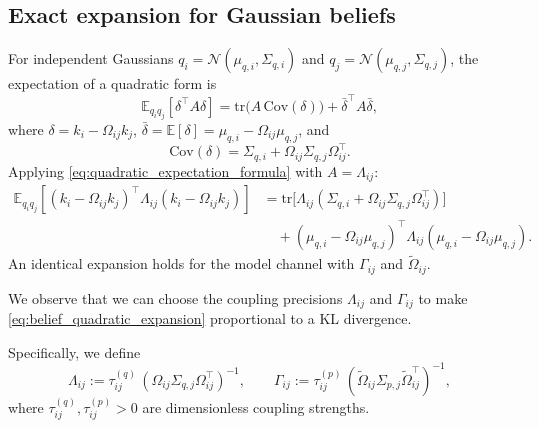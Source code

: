 \documentclass[11pt]{article}
\begin{document}
\subsection{Exact expansion for Gaussian beliefs}
For independent Gaussians $q_i = \mathcal{N}(\mu_{q,i},\Sigma_{q,i})$ and $q_j = \mathcal{N}(\mu_{q,j},\Sigma_{q,j})$, the expectation of a quadratic form is
\begin{equation}
\mathbb{E}_{q_i q_j}[\delta^\top A \delta]
= \mathrm{tr}\!\big(A\,\mathrm{Cov}(\delta)\big)
+ \bar{\delta}^\top A \bar{\delta},
\label{eq:quadratic_expectation_formula}
\end{equation}
where $\delta = k_i - \Omega_{ij}k_j$, $\bar{\delta} = \mathbb{E}[\delta] = \mu_{q,i} - \Omega_{ij}\mu_{q,j}$, and
\begin{equation}
\mathrm{Cov}(\delta) = \Sigma_{q,i} + \Omega_{ij}\Sigma_{q,j}\Omega_{ij}^\top.
\label{eq:delta_covariance}
\end{equation}
Applying \eqref{eq:quadratic_expectation_formula} with $A = \Lambda_{ij}$:
\begin{equation}
\begin{aligned}
\mathbb{E}_{q_i q_j}
[(k_i-\Omega_{ij}k_j)^\top\Lambda_{ij}(k_i-\Omega_{ij}k_j)]
&=\mathrm{tr}\!\big[\Lambda_{ij}(\Sigma_{q,i}+\Omega_{ij}\Sigma_{q,j}\Omega_{ij}^\top)\big]\\
&\quad+(\mu_{q,i}-\Omega_{ij}\mu_{q,j})^\top
\Lambda_{ij}
(\mu_{q,i}-\Omega_{ij}\mu_{q,j}).
\end{aligned}
\label{eq:belief_quadratic_expansion}
\end{equation}
An identical expansion holds for the model channel with $\Gamma_{ij}$ and $\tilde{\Omega}_{ij}$.

We observe that we can choose the coupling precisions $\Lambda_{ij}$ and $\Gamma_{ij}$ to make \eqref{eq:belief_quadratic_expansion} proportional to a KL divergence.

Specifically, we define
\begin{equation}
\Lambda_{ij}:=\tau^{(q)}_{ij}\,(\Omega_{ij}\Sigma_{q,j}\Omega_{ij}^\top)^{-1},
\qquad 
\Gamma_{ij}:=\tau^{(p)}_{ij}\,(\tilde{\Omega}_{ij}\Sigma_{p,j}\tilde{\Omega}_{ij}^\top)^{-1},
\label{eq:precision_choice}
\end{equation}
where $\tau^{(q)}_{ij}, \tau^{(p)}_{ij} > 0$ are dimensionless coupling strengths.
\end{document}
